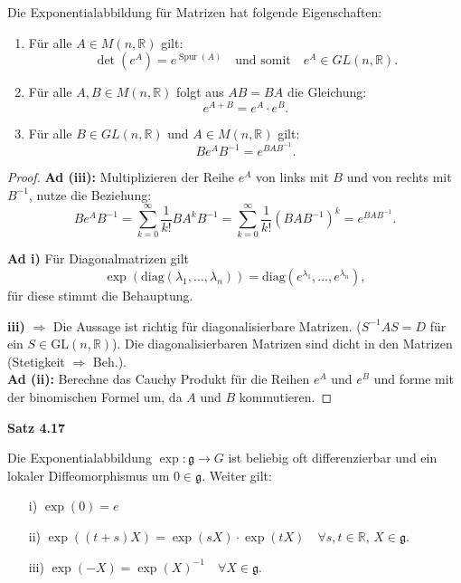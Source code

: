 \documentclass[fleqn, 12pt, letterpaper]{article}
\begin{document}
Die Exponentialabbildung für Matrizen hat folgende Eigenschaften:
\begin{enumerate}
    \item Für alle \( A \in M(n, \mathbb{R}) \) gilt:
    \[
    \det(e^A) = e^{\operatorname{Spur}(A)} \quad \text{und somit} \quad e^A \in GL(n, \mathbb{R}).
    \]
    
    \item Für alle \( A, B \in M(n, \mathbb{R}) \) folgt aus \( AB = BA \) die Gleichung:
    \[
    e^{A+B} = e^A \cdot e^B.
    \]
    
    \item Für alle \( B \in GL(n, \mathbb{R}) \) und \( A \in M(n, \mathbb{R}) \) gilt:
    \[
    B e^A B^{-1} = e^{BAB^{-1}}.
    \]
\end{enumerate}
\begin{proof}
    \textbf{Ad (iii):} Multiplizieren der Reihe \( e^A \) von links mit \( B \) und von rechts mit \( B^{-1} \), nutze die Beziehung:
\[
B e^A B^{-1} = \sum_{k=0}^\infty \frac{1}{k!} B A^k B^{-1} = \sum_{k=0}^\infty \frac{1}{k!} (BAB^{-1})^k = e^{BAB^{-1}}.
\]

\textbf{Ad i)} Für Diagonalmatrizen gilt 
\[
    \exp\left(\mathrm{diag}(\lambda_1, \ldots, \lambda_n)\right) = \mathrm{diag}\left(e^{\lambda_1}, \ldots, e^{\lambda_n}\right),
\]
für diese stimmt die Behauptung.
    
\textbf{iii)} $\Rightarrow$ Die Aussage ist richtig für diagonalisierbare Matrizen. ($S^{-1}AS=D$ für ein $S\in \mathrm{GL}(n,\mathbb{R})$).
Die diagonalisierbaren Matrizen sind dicht in den Matrizen (Stetigkeit $\Rightarrow$ Beh.).\\

\textbf{Ad (ii):} Berechne das Cauchy Produkt für die Reihen \( e^A \) und \( e^B \) und forme mit der binomischen Formel um, da \( A \) und \( B \) kommutieren.
\end{proof}

\textbf{Satz 4.17}

Die Exponentialabbildung \( \exp: \mathfrak{g} \rightarrow G \) ist beliebig oft differenzierbar und ein lokaler Diffeomorphismus um \( 0 \in \mathfrak{g} \). Weiter gilt:
\begin{enumerate}
    \item[i)] \(
    \exp(0) = e
    \)
    \item[ii)] \(
    \exp((t+s)X) = \exp(sX) \cdot \exp(tX) \quad \forall s, t \in \mathbb{R}, \, X \in \mathfrak{g}.
    \)
    \item[iii)] \(
    \exp(-X) = \exp(X)^{-1} \quad \forall X \in \mathfrak{g}.
    \)
\end{enumerate}
\end{document}
